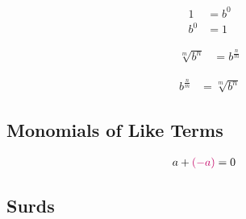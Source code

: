 \documentclass[20150903-160354-rs2.2-MarksMathNotebook.tex]{subfiles}
\begin{document}
\begin{definition}
\begin{subequations}
\begin{align}
1&= b^0  \label{eq:poid1} \\
b^{0}&= 1  \label{eq:poid2}
\end{align}
\end{subequations}
\end{definition}

\begin{notation}
\begin{align}
\sqrt[m]{b^n} &= b^{\frac{n}{m}}	 \label{eq:rtpo}
\end{align}
\end{notation}

\begin{notation}
\begin{align}
b^{\frac{n}{m}} &= \sqrt[m]{b^n}	 \label{eq:potr}
\end{align}
\end{notation}


\subsection{Monomials of Like Terms}


\begin{definition}
\begin{subequations}
\begin{align}
a + \alert{(-a)} &= 0 \label{eq:ai}
\end{align}
\end{subequations}
\end{definition}

\subsection{Surds}
\end{document}
